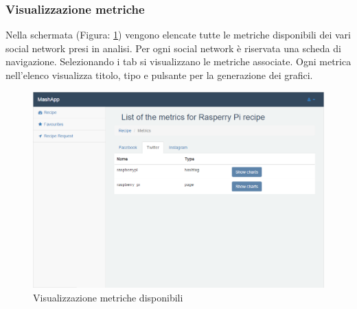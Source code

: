 		\subsubsection{Visualizzazione metriche} %
		\label{sec:visualizzazione_metriche}
			Nella schermata (Figura: \ref{fig:visualizzazione_metriche}) vengono elencate tutte le metriche disponibili dei vari social network presi in analisi.\newline
			Per ogni social network è riservata una scheda di navigazione. Selezionando i tab si visualizzano le metriche associate.\newline
			Ogni metrica nell'elenco visualizza titolo, tipo e pulsante per la generazione dei grafici.
			\begin{figure}[H]
				\centering
				\centerline{\includegraphics[width=14cm]{images/visualizzazione_metriche.png}}
				\caption{Visualizzazione metriche disponibili}
				\label{fig:visualizzazione_metriche}
			\end{figure}


